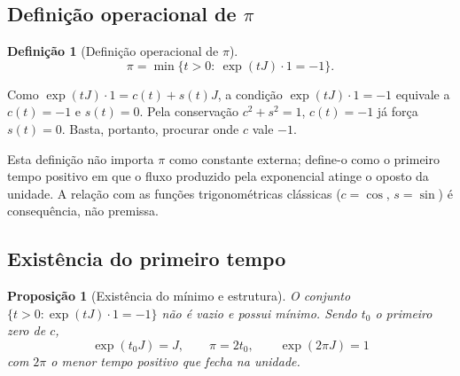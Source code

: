 \documentclass[11pt,a4paper]{article}
\newtheorem{definicao}{Definição}
\newtheorem{proposicao}{Proposição}
\begin{document}
\subsection{Definição operacional de \(\pi\)}

\begin{definicao}[Definição operacional de \(\pi\)]
\label{def:pi-op}
\[
\boxed{\pi=\min\{t>0:\ \exp(tJ)\cdot 1=-1\}.}
\]
\end{definicao}

Como \(\exp(tJ)\cdot 1=c(t)+s(t)J\), a condição \(\exp(tJ)\cdot 1=-1\) equivale a \(c(t)=-1\) e \(s(t)=0\). Pela conservação \(c^2+s^2=1\), \(c(t)=-1\) já força \(s(t)=0\). Basta, portanto, procurar onde \(c\) vale \(-1\).

Esta definição não importa \(\pi\) como constante externa; define-o como o primeiro tempo positivo em que o fluxo produzido pela exponencial atinge o oposto da unidade. A relação com as funções trigonométricas clássicas (\(c=\cos\), \(s=\sin\)) é consequência, não premissa.

\subsection{Existência do primeiro tempo}

\begin{proposicao}[Existência do mínimo e estrutura]
\label{prop:pi-existe}
O conjunto \(\{t>0:\exp(tJ)\cdot 1=-1\}\) não é vazio e possui mínimo. Sendo \(t_0\) o primeiro zero de \(c\),
\[
\exp(t_0 J)=J,\qquad
\pi=2t_0,\qquad
\exp(2\pi J)=1
\]
com \(2\pi\) o menor tempo positivo que fecha na unidade.
\end{proposicao}
\end{document}
